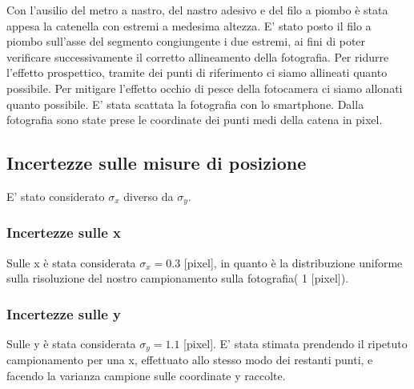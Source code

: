 \documentclass{article}
\begin{document}
Con l'ausilio del metro a nastro, del nastro adesivo e del filo a piombo è  stata appesa la catenella con estremi a medesima altezza.
E' stato posto il filo a piombo sull'asse del segmento congiungente i due estremi, ai fini di poter verificare successivamente il corretto allineamento della fotografia.
Per ridurre l'effetto prospettico, tramite dei punti di riferimento ci siamo allineati quanto possibile.
Per mitigare l'effetto occhio di pesce della fotocamera ci siamo allonati quanto possibile.
E' stata scattata la fotografia con lo smartphone.
Dalla fotografia sono state prese le coordinate dei punti medi della catena in pixel.

\subsection{Incertezze sulle misure di posizione}
E' stato considerato  $\sigma_x$ diverso da $\sigma_y$.

\subsubsection{Incertezze sulle x}
Sulle x è stata considerata  $\sigma_x= 0.3$ [pixel], in quanto è la distribuzione uniforme sulla risoluzione del nostro campionamento sulla fotografia( 1 [pixel]). 

\subsubsection{Incertezze sulle y}
Sulle y è stata considerata  $\sigma_y= 1.1$ [pixel].
E' stata stimata prendendo il ripetuto campionamento per una x, effettuato allo stesso modo dei restanti punti, e facendo la varianza campione sulle coordinate y raccolte.
\end{document}
